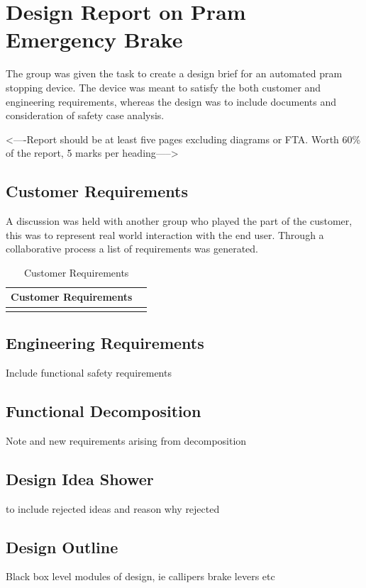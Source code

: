 \documentclass[12pt,a4paper]{article}
\begin{document}
\thispagestyle{fancy}
\section[Task One]{Design Report on Pram Emergency Brake}\medskip
The group was given the task to create a design brief for an automated pram stopping device. The device was meant to satisfy the both customer and engineering requirements, whereas the design was to include documents and consideration of safety case analysis. 

<----Report should be at least five pages excluding diagrams or FTA. Worth 60\% of the report, 5 marks per heading----->

\subsection{Customer Requirements}
A discussion was held with another group who played the part of the customer, this was to represent real world interaction with the end user. Through a collaborative process a list of requirements was generated.
\begin{table}[H]
\label{tab:win}
	\begin{center}
	\begin{tabular}{p{}|p{}}
\toprule 
{\bf Customer Requirements} & {\bf }\\
\midrule
 & \\

\bottomrule
	\end{tabular}
\end{center}
\caption{Customer Requirements}
\end{table}
\subsection{Engineering Requirements}
Include functional safety requirements
\subsection{Functional Decomposition}
Note and new requirements arising from decomposition
\subsection{Design Idea Shower}
to include rejected ideas and reason why rejected
\subsection{Design Outline}
Black box level modules of design, ie callipers brake levers etc
\end{document}
